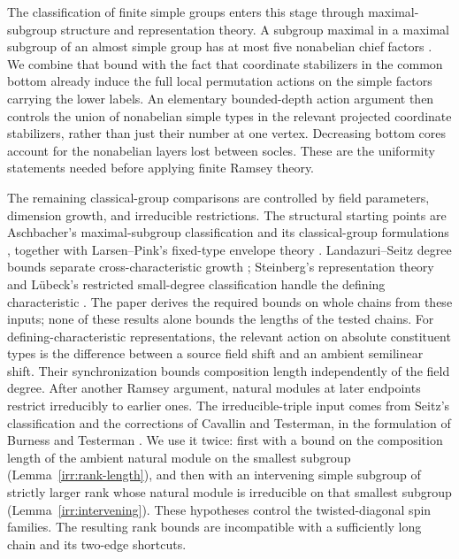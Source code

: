The classification of finite simple groups enters this stage through
maximal-subgroup structure and representation theory. A subgroup maximal
in a maximal subgroup of an almost simple group has at most five nonabelian chief
factors \cite[Proposition~8.1]{BurnessLiebeckShalev2017}.
We combine that bound with the fact that coordinate stabilizers in the
common bottom already induce the full local permutation actions on the
simple factors carrying the lower labels.
An elementary bounded-depth action argument then
controls the union of nonabelian simple types in the relevant projected
coordinate stabilizers, rather than just their number at one vertex. Decreasing
bottom cores account for the nonabelian layers lost between socles. These are the
uniformity statements needed before applying finite Ramsey theory.

The remaining classical-group comparisons are controlled by field
parameters, dimension growth, and irreducible restrictions.
The structural starting points are Aschbacher's maximal-subgroup
classification and its classical-group formulations
\cite{Aschbacher1984,KleidmanLiebeck1990}, together with Larsen--Pink's
fixed-type envelope theory \cite{LarsenPink2011}.
Landazuri--Seitz degree bounds separate cross-characteristic growth
\cite{LandazuriSeitz1974,Hasa2014}; Steinberg's representation theory and
L\"ubeck's restricted small-degree classification handle the defining
characteristic \cite{Steinberg1963,SteinbergNotes,Luebeck2001}.
The paper derives the required bounds on whole chains from these inputs;
none of these results alone bounds the lengths of the tested chains.
For defining-characteristic representations, the relevant action on
absolute constituent types is the difference between a source field
shift and an ambient semilinear shift. Their synchronization bounds
composition length independently of the field degree.
After another Ramsey argument, natural modules at later endpoints
restrict irreducibly to earlier ones.  The irreducible-triple input
comes from Seitz's classification and the corrections of Cavallin and
Testerman, in the formulation of Burness and Testerman
\cite{Seitz1987,CavallinTesterman2019,BurnessTesterman2018}.
We use it twice: first with a bound on the composition length of the
ambient natural module on the smallest subgroup
(Lemma~\ref{irr:rank-length}), and then with an intervening simple
subgroup of strictly larger rank whose natural module is irreducible
on that smallest subgroup (Lemma~\ref{irr:intervening}).
These hypotheses control the twisted-diagonal spin families.
The resulting rank bounds are incompatible with a sufficiently long
chain and its two-edge shortcuts.

